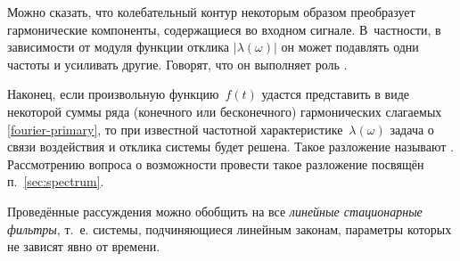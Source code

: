 
Можно сказать, что колебательный контур некоторым образом
преобразует гармонические компоненты, содержащиеся во входном сигнале.
В~частности, в зависимости от модуля функции отклика $|\lambda(\omega)|$ 
он может подавлять одни частоты и усиливать другие.
Говорят, что он выполняет роль .

Наконец, если произвольную функцию~$f(t)$ удастся представить в виде
некоторой суммы ряда (конечного или бесконечного) гармонических слагаемых
\eqref{fourier-primary}, то при известной частотной характеристике~$\lambda(\omega)$ 
задача о связи воздействия и отклика системы будет решена.
Такое разложение называют . Рассмотрению вопроса о возможности 
провести такое разложение посвящён п.~\ref{sec:spectrum}.


%


Проведённые рассуждения можно обобщить на все \emph{линейные стационарные
фильтры}, т.~е. системы, подчиняющиеся линейным законам, параметры которых 
не зависят явно от времени.

